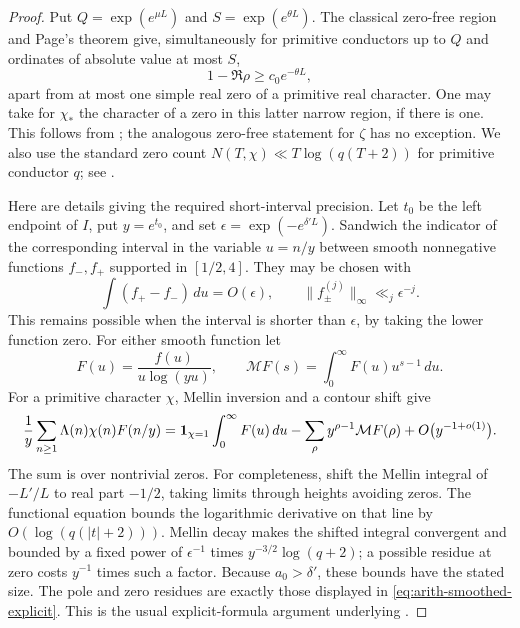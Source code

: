 \begin{proof}
Put $Q=\exp(e^{\mu L})$ and $S=\exp(e^{\theta L})$. The classical
zero-free region and Page's theorem give, simultaneously for primitive
conductors up to $Q$ and ordinates of absolute value at most $S$,
\begin{equation}\label{eq:arith-zero-free}
                     1-\Re\rho\geq c_0e^{-\theta L},
\end{equation}
apart from at most one simple real zero of a primitive real character.
One may take for $\chi_*$ the character of a zero in this latter narrow
region, if there is one. This follows from
\cite[Theorem~11.3 and Corollary~11.10]{MontgomeryVaughan2007}; the analogous
zero-free statement for $\zeta$ has no exception. We also use the standard
zero count $N(T,\chi)\ll T\log(q(T+2))$ for primitive conductor $q$;
see \cite[Section~3.7.3]{Helfgott}.

Here are details giving the required short-interval precision. Let $t_0$ be
the left endpoint of $I$, put $y=e^{t_0}$, and set
$\epsilon=\exp(-e^{\delta'L})$. Sandwich the indicator of the corresponding
interval in the variable $u=n/y$ between smooth nonnegative functions
$f_-,f_+$ supported in $[1/2,4]$. They may be chosen with
\[
 \int(f_+-f_-)\,du=O(\epsilon),\qquad
 \|f_\pm^{(j)}\|_\infty\ll_j\epsilon^{-j}.
\]
This remains possible when the interval is shorter than $\epsilon$, by
taking the lower function zero. For either smooth function let
\[
 F(u)=\frac{f(u)}{u\log(yu)},\qquad
 \mathcal M F(s)=\int_0^\infty F(u)u^{s-1}\,du.
\]
For a primitive character $\chi$, Mellin inversion and a contour shift give
\begin{equation}\label{eq:arith-smoothed-explicit}
 \frac1y\sum_{n\geq1}\Lambda(n)\chi(n)F(n/y)
 =\mathbf 1_{\chi=1}\int_0^\infty F(u)\,du
   -\sum_\rho y^{\rho-1}\mathcal M F(\rho)
   +O\bigl(y^{-1+o(1)}\bigr).
\end{equation}
The sum is over nontrivial zeros. For completeness, shift the Mellin integral
of $-L'/L$ to real part $-1/2$, taking limits through heights avoiding zeros.
The functional equation bounds the logarithmic derivative on that line by
$O(\log(q(|t|+2)))$. Mellin decay makes the shifted integral convergent and
bounded by a fixed power of $\epsilon^{-1}$ times
$y^{-3/2}\log(q+2)$; a possible residue at zero costs
$y^{-1}$ times such a factor. Because $a_0>\delta'$, these bounds have the
stated size. The pole and zero residues are exactly those displayed in
\eqref{eq:arith-smoothed-explicit}. This is the usual explicit-formula
argument underlying \cite[Theorem~11.16]{MontgomeryVaughan2007}.


\end{proof}
